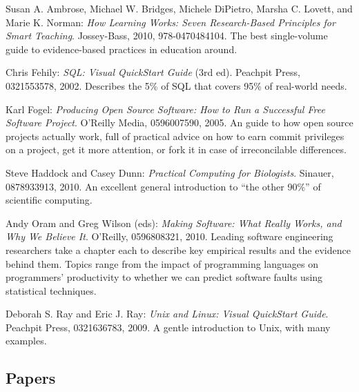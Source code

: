 \documentclass{book}
\begin{document}
\begin{swcdescription}

\item[Susan A. Ambrose, Michael W. Bridges, Michele DiPietro, Marsha C.
Lovett, and Marie K. Norman:
\emph{How Learning Works: Seven Research-Based Principles for Smart Teaching}.
Jossey-Bass, 2010, 978-0470484104.]
The best single-volume guide to evidence-based practices in education
around.

\item[Chris Fehily: \emph{SQL: Visual QuickStart Guide} (3rd ed).
Peachpit Press, 0321553578, 2002.]
Describes the 5\% of SQL that covers 95\% of real-world needs.

\item[Karl Fogel: \emph{Producing Open Source Software: How to Run a
Successful Free Software Project}. O'Reilly Media, 0596007590, 2005.]
An guide to how open source projects actually work, full of practical
advice on how to earn commit privileges on a project, get it more
attention, or fork it in case of irreconcilable differences.

\item[Steve Haddock and Casey Dunn: \emph{Practical Computing for
Biologists}. Sinauer, 0878933913, 2010.]
An excellent general introduction to ``the other 90\%'' of scientific
computing.

\item[Andy Oram and Greg Wilson (eds): \emph{Making Software: What
Really Works, and Why We Believe It}. O'Reilly, 0596808321, 2010.]
Leading software engineering researchers take a chapter each to describe
key empirical results and the evidence behind them. Topics range from
the impact of programming languages on programmers' productivity to
whether we can predict software faults using statistical techniques.

\item[Deborah S. Ray and Eric J. Ray: \emph{Unix and Linux: Visual
QuickStart Guide}. Peachpit Press, 0321636783, 2009.]
A gentle introduction to Unix, with many examples.

\end{swcdescription}

\subsection{Papers}
\end{document}
